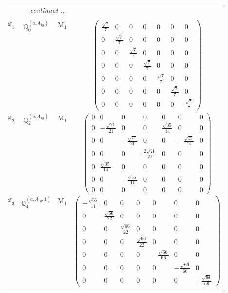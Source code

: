 \documentclass[fleqn,10pt,landscape]{article}
\begin{document}
\begin{itemize}
\begin{center}
\begin{longtable}{c|c|c|c}
 \hline \hline
\multicolumn{3}{r}{\footnotesize\it continued ...} \\ \endfoot

 \hline \hline
\multicolumn{3}{r}{} \\ \endlastfoot

$ \mathbb{X}_{1} $ & $\mathbb{Q}_{0}^{(a,A_{1g})}$ & M$_{1}$ & $\begin{pmatrix} \frac{\sqrt{7}}{7} & 0 & 0 & 0 & 0 & 0 & 0 \\ 0 & \frac{\sqrt{7}}{7} & 0 & 0 & 0 & 0 & 0 \\ 0 & 0 & \frac{\sqrt{7}}{7} & 0 & 0 & 0 & 0 \\ 0 & 0 & 0 & \frac{\sqrt{7}}{7} & 0 & 0 & 0 \\ 0 & 0 & 0 & 0 & \frac{\sqrt{7}}{7} & 0 & 0 \\ 0 & 0 & 0 & 0 & 0 & \frac{\sqrt{7}}{7} & 0 \\ 0 & 0 & 0 & 0 & 0 & 0 & \frac{\sqrt{7}}{7} \end{pmatrix}$ \\
$ \mathbb{X}_{2} $ & $\mathbb{Q}_{2}^{(a,A_{1g})}$ & M$_{1}$ & $\begin{pmatrix} 0 & 0 & 0 & 0 & 0 & 0 & 0 \\ 0 & - \frac{\sqrt{21}}{21} & 0 & 0 & \frac{\sqrt{35}}{14} & 0 & 0 \\ 0 & 0 & - \frac{\sqrt{21}}{21} & 0 & 0 & - \frac{\sqrt{35}}{14} & 0 \\ 0 & 0 & 0 & \frac{2 \sqrt{21}}{21} & 0 & 0 & 0 \\ 0 & \frac{\sqrt{35}}{14} & 0 & 0 & 0 & 0 & 0 \\ 0 & 0 & - \frac{\sqrt{35}}{14} & 0 & 0 & 0 & 0 \\ 0 & 0 & 0 & 0 & 0 & 0 & 0 \end{pmatrix}$ \\
$ \mathbb{X}_{3} $ & $\mathbb{Q}_{4}^{(a,A_{1g},1)}$ & M$_{1}$ & $\begin{pmatrix} - \frac{\sqrt{66}}{11} & 0 & 0 & 0 & 0 & 0 & 0 \\ 0 & \frac{\sqrt{66}}{22} & 0 & 0 & 0 & 0 & 0 \\ 0 & 0 & \frac{\sqrt{66}}{22} & 0 & 0 & 0 & 0 \\ 0 & 0 & 0 & \frac{\sqrt{66}}{22} & 0 & 0 & 0 \\ 0 & 0 & 0 & 0 & - \frac{\sqrt{66}}{66} & 0 & 0 \\ 0 & 0 & 0 & 0 & 0 & - \frac{\sqrt{66}}{66} & 0 \\ 0 & 0 & 0 & 0 & 0 & 0 & - \frac{\sqrt{66}}{66} \end{pmatrix}$ \\

\end{longtable}
\end{center}
\end{itemize}
\end{document}

